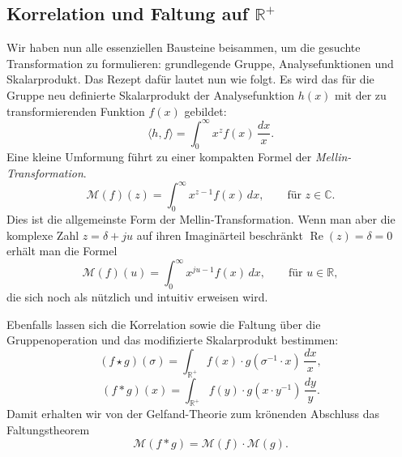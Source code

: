 \subsection{Korrelation und Faltung auf $\mathbb{R^+}$
\label{mellin:subsection:faltung}}
Wir haben nun alle essenziellen Bausteine beisammen, um die gesuchte 
Transformation zu formulieren: grundlegende Gruppe, Analysefunktionen 
und Skalarprodukt.
Das Rezept dafür lautet nun wie folgt. Es wird das für die Gruppe neu 
definierte Skalarprodukt der Analysefunktion $h(x)$ mit der zu 
transformierenden Funktion $f(x)$ gebildet:
\begin{equation}
    \langle h,f \rangle 
    = \int_0^\infty x^{z} f(x) \,\frac{{d}x}{x}
    .
\end{equation}
Eine kleine Umformung führt zu einer kompakten Formel der 
{\em Mellin-Transformation}.
\begin{equation}
    \mathcal{M}(f)(z) 
    = \int_{0}^{\infty} x^{z-1} f(x) \,{d}x,
    \qquad\text{für $z \in \mathbb{C}$}
    .
    \label{mellin:mellin}
\end{equation}
Dies ist die allgemeinste Form der Mellin-Transformation. 
Wenn man aber die komplexe Zahl $z = \delta + ju$ auf ihren Imaginärteil 
beschränkt $\operatorname{Re}(z) = \delta = 0$ erhält man die Formel
\begin{equation}
    \mathcal{M}(f)(u) 
    = \int_{0}^{\infty} x^{ju-1} f(x) \,{d}x,
    \qquad\text{für $u \in \mathbb{R}$}
    ,
    \label{mellin:mellinu}
\end{equation}
die sich noch als nützlich und intuitiv erweisen wird.

Ebenfalls lassen sich die Korrelation sowie die Faltung über die 
Gruppenoperation und das modifizierte Skalarprodukt bestimmen:
\begin{equation}
    (f \star g)(\sigma ) 
    = \int_\mathbb{R^+} 
    f(x) \cdot g(\sigma ^{-1} \cdot x)\,\frac{{d}x}{x}
    ,
    \label{mellin:kreuzkorrelation*}
\end{equation}
\begin{equation}
    (f \ast g)(x) 
    = \int_\mathbb{R^+} 
    f(y) \cdot g(x \cdot y^{-1})\,\frac{{d}y}{y} 
    .
\end{equation}
Damit erhalten wir von der Gelfand-Theorie zum krönenden Abschluss das 
Faltungstheorem
\begin{equation}
    \mathcal{M}\left(f \ast g\right)
    = \mathcal{M}\left(f\right) \cdot \mathcal{M}\left(g\right)
    .
\end{equation}


